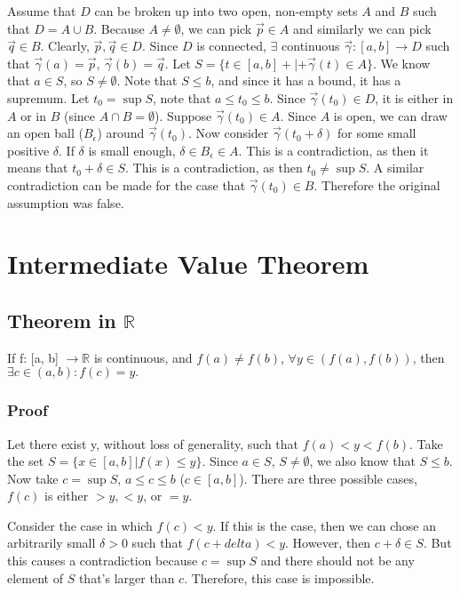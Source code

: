 \documentclass[11 pt, twoside]{article}
\begin{document}
Assume that $D$ can be broken up into two open, non-empty sets $A$ and $B$ such
that $D = A \cup B$. Because $A \neq \emptyset$, we can pick $\vec{p} \in A$ and
similarly we can pick $\vec{q} \in B$. Clearly, $\vec{p}, \vec{q} \in D$. Since
$D$ is connected, $\exists$ continuous $\vec{\gamma}: [a, b] \to D$ such that
$\vec{\gamma}(a) = \vec{p}$, $\vec{\gamma}(b) = \vec{q}$. Let $S = \{t \in [a,b]
+|+ \vec{\gamma}(t) \in A\}$. We know that $a \in S$, so $S \neq \emptyset$.
Note that $S \leq b$, and since it has a bound, it has a supremum. Let $t_0 =
\sup S$, note that $a \leq t_0 \leq b$. Since $\vec{\gamma}(t_0) \in D$, it is
either in $A$ or in $B$ (since $A \cap B = \emptyset$). Suppose
$\vec{\gamma}(t_0) \in A$. Since $A$ is open, we can draw an open ball
($B_\epsilon$) around $\vec{\gamma}(t_0)$. Now consider $\vec{\gamma}(t_0 +
\delta)$ for some small positive $\delta$. If $\delta$ is small enough, $\delta
\in B_\epsilon \in A$. This is a contradiction, as then it means that $t_0 +
\delta \in S$. This is a contradiction, as then $t_0 \neq \sup S$. A similar
contradiction can be made for the case that $\vec{\gamma}(t_0) \in B$. Therefore
the original assumption was false.

\section{Intermediate Value Theorem}

\subsection{Theorem in $\mathbb{R}$}
If f: [a, b] $\to \mathbb{R}$ is continuous, and $f(a) \neq f(b)$, $\forall y \in (f(a), f(b))$, then $\exists c \in (a, b): f(c) = y.$

\subsubsection{Proof}
Let there exist y, without loss of generality, such that $f(a) < y < f(b)$. Take the set $S = \{x \in [a, b] | f(x) \leq
y\}$. Since $a \in S$, $S \neq \emptyset$, we also know that $S \leq b$. Now
take $c = \sup S$, $a \leq c \leq b$ ($c \in [a, b]$). There are three possible
cases, $f(c)$ is either $> y, < y$, or $= y$.

Consider the case in which $f(c) < y$. If this is the case, then we can chose an
arbitrarily small $\delta > 0$ such that $f(c + delta) < y$. However, then $c +
\delta \in S$. But this causes a contradiction because $c = \sup S$ and there
should not be any element of $S$ that's larger than $c$. Therefore, this case is
impossible.
\end{document}
